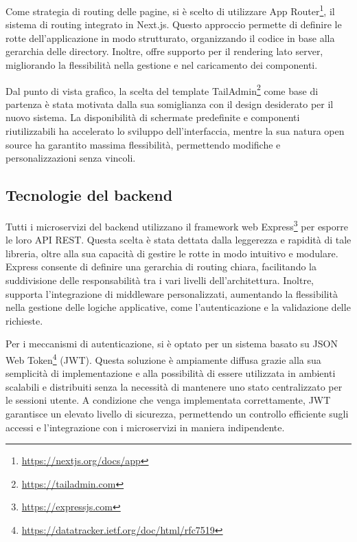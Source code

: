 Come strategia di routing delle pagine, si è scelto di utilizzare App Router\footnote{\url{https://nextjs.org/docs/app}}, il sistema di routing integrato in Next.js. Questo approccio permette di definire le rotte dell'applicazione in modo strutturato, organizzando il codice in base alla gerarchia delle directory. Inoltre, offre supporto per il rendering lato server, migliorando la flessibilità nella gestione e nel caricamento dei componenti.

Dal punto di vista grafico, la scelta del template TailAdmin\footnote{\url{https://tailadmin.com}} come base di partenza è stata motivata dalla sua somiglianza con il design desiderato per il nuovo sistema. La disponibilità di schermate predefinite e componenti riutilizzabili ha accelerato lo sviluppo dell’interfaccia, mentre la sua natura open source ha garantito massima flessibilità, permettendo modifiche e personalizzazioni senza vincoli.

\subsection{Tecnologie del backend}
Tutti i microservizi del backend utilizzano il framework web Express\footnote{\url{https://expressjs.com}} per esporre le loro API REST. Questa scelta è stata dettata dalla leggerezza e rapidità di tale libreria, oltre alla sua capacità di gestire le rotte in modo intuitivo e modulare. Express consente di definire una gerarchia di routing chiara, facilitando la suddivisione delle responsabilità tra i vari livelli dell'architettura. Inoltre, supporta l'integrazione di middleware personalizzati, aumentando la flessibilità nella gestione delle logiche applicative, come l'autenticazione e la validazione delle richieste.

Per i meccanismi di autenticazione, si è optato per un sistema basato su JSON Web Token\footnote{\url{https://datatracker.ietf.org/doc/html/rfc7519}} (JWT). Questa soluzione è ampiamente diffusa grazie alla sua semplicità di implementazione e alla possibilità di essere utilizzata in ambienti scalabili e distribuiti senza la necessità di mantenere uno stato centralizzato per le sessioni utente. A condizione che venga implementata correttamente, JWT garantisce un elevato livello di sicurezza, permettendo un controllo efficiente sugli accessi e l'integrazione con i microservizi in maniera indipendente.


